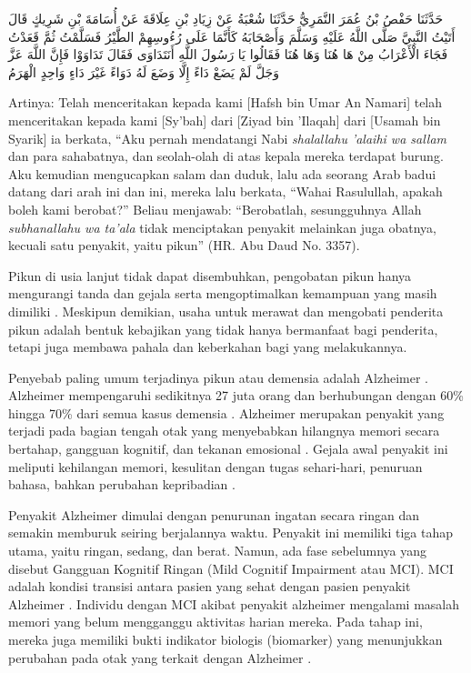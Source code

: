     \begin{flushright}
        \begin{RLtext}
            حَدَّثَنَا حَفْصُ بْنُ عُمَرَ النَّمَرِيُّ حَدَّثَنَا شُعْبَةُ عَنْ زِيَادِ بْنِ عِلَاقَةَ عَنْ أُسَامَةَ بْنِ شَرِيكٍ قَالَ أَتَيْتُ النَّبِيَّ صَلَّى اللَّهُ عَلَيْهِ وَسَلَّمَ وَأَصْحَابَهُ كَأَنَّمَا عَلَى رُءُوسِهِمْ الطَّيْرُ فَسَلَّمْتُ ثُمَّ قَعَدْتُ فَجَاءَ الْأَعْرَابُ مِنْ هَا هُنَا وَهَا هُنَا فَقَالُوا يَا رَسُولَ اللَّهِ أَنَتَدَاوَى فَقَالَ تَدَاوَوْا فَإِنَّ اللَّهَ عَزَّ وَجَلَّ لَمْ يَضَعْ دَاءً إِلَّا وَضَعَ لَهُ دَوَاءً غَيْرَ دَاءٍ وَاحِدٍ الْهَرَمُ
        \end{RLtext}
    \end{flushright}

    Artinya: Telah menceritakan kepada kami [Hafsh bin Umar An Namari] telah menceritakan kepada kami [Sy'bah] dari [Ziyad bin 'Ilaqah] dari [Usamah bin Syarik] ia berkata, “Aku pernah mendatangi Nabi \textit{shalallahu 'alaihi wa sallam} dan para sahabatnya, dan seolah-olah di atas kepala mereka terdapat burung. Aku kemudian mengucapkan salam dan duduk, lalu ada seorang Arab badui datang dari arah ini dan ini, mereka lalu berkata, “Wahai Rasulullah, apakah boleh kami berobat?” Beliau menjawab: “Berobatlah, sesungguhnya Allah \textit{subhanallahu wa ta'ala} tidak menciptakan penyakit melainkan juga obatnya, kecuali satu penyakit, yaitu pikun” (HR. Abu Daud No. 3357). 

    Pikun di usia lanjut tidak dapat disembuhkan, pengobatan pikun hanya mengurangi tanda dan gejala serta mengoptimalkan kemampuan yang masih dimiliki \autocite{Sari2022}. Meskipun demikian, usaha untuk merawat dan mengobati penderita pikun adalah bentuk kebajikan yang tidak hanya bermanfaat bagi penderita, tetapi juga membawa pahala dan keberkahan bagi yang melakukannya.

    Penyebab paling umum terjadinya pikun atau demensia adalah Alzheimer \autocite{Suangga2024}. Alzheimer mempengaruhi sedikitnya 27 juta orang dan berhubungan dengan 60\% hingga 70\% dari semua kasus demensia \autocite{Ferreira2014}. Alzheimer merupakan penyakit yang terjadi pada bagian tengah otak yang menyebabkan hilangnya memori secara bertahap, gangguan kognitif, dan tekanan emosional \autocite{Uddindar2023}. Gejala awal penyakit ini meliputi kehilangan memori, kesulitan dengan tugas sehari-hari, penuruan bahasa, bahkan perubahan kepribadian \autocite{Lim2022}.

    Penyakit Alzheimer dimulai dengan penurunan ingatan secara ringan dan semakin memburuk seiring berjalannya waktu. Penyakit ini memiliki tiga tahap utama, yaitu ringan, sedang, dan berat. Namun, ada fase sebelumnya yang disebut Gangguan Kognitif Ringan (Mild Cognitif Impairment atau MCI). MCI adalah kondisi transisi antara pasien yang sehat dengan pasien penyakit Alzheimer . Individu dengan MCI akibat penyakit alzheimer mengalami masalah memori yang belum mengganggu aktivitas harian mereka. Pada tahap ini, mereka juga memiliki bukti indikator biologis (biomarker) yang menunjukkan perubahan pada otak yang terkait dengan Alzheimer \autocite{Dorado2022}.

